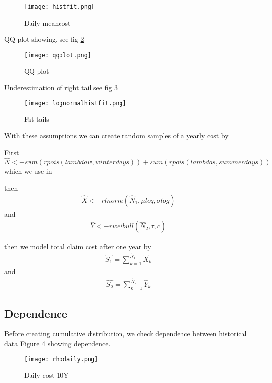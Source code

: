 \documentclass[11pt]{article}
\begin{document}
 \begin{figure}[H]
 \center
  \texttt{[image: histfit.png]}
  \caption{Daily meancost}
  \label{fig:samplefig3}
\end{figure}

QQ-plot showing, see fig \ref{fig:qqplot}

 \begin{figure}[H]
 \center
  \texttt{[image: qqplot.png]}
  \caption{QQ-plot}
  \label{fig:qqplot}
\end{figure}

Underestimation of right tail see fig \ref{fig:fit}

 \begin{figure}[H]
 \center
  \texttt{[image: lognormalhistfit.png]}
  \caption{Fat tails}
  \label{fig:fit}
\end{figure}


With these assumptions we can 
 create random samples of a yearly cost by

First $\hat{N} <-  sum(rpois(lambdaw,winterdays)) +  sum(rpois(lambdas,summerdays))$
which we use in

then
\begin{align*} 
	\hat{X} <- rlnorm(\hat{N}_1,\mu log,\sigma log) 
\end{align*}
and
\begin{align*} 
	 \hat{Y} <- rweibull(\hat{N}_2,\tau,c)
\end{align*}


then we model total claim cost after one year by
\begin{align} \label{eq:sum1}
	\hat{S_1} = \sum_{k=1}^{\hat{N}_1} \hat{ X}_k   
\end{align}
and
\begin{align} \label{eq:sum2}
	 \hat{S_2} = \sum_{k=1}^{\hat{N}_2} \hat{Y}_k
\end{align}


\subsection*{Dependence}
Before creating cumulative distribution, we check dependence between historical data
 Figure \ref{fig:samplefig4} showing dependence.


 \begin{figure}[H]
 \center
  \texttt{[image: rhodaily.png]}
  \caption{Daily cost 10Y}
  \label{fig:samplefig4}
\end{figure}
\end{document}
